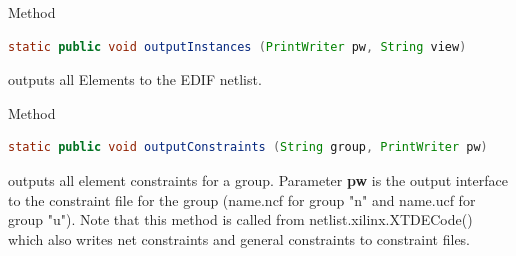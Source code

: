     Method
    \begin{lstlisting}[gobble=4, language=java]
        static public void outputInstances (PrintWriter pw, String view)
    \end{lstlisting}
    outputs all Elements to the EDIF netlist.

    Method
    \begin{lstlisting}[gobble=4, language=java]
        static public void outputConstraints (String group, PrintWriter pw)
    \end{lstlisting}
    outputs all element constraints for a group. Parameter {\bf pw} is
    the output interface to the constraint file for the group (name.ncf
    for group "n" and name.ucf for group "u"). Note that this method is
    called from netlist.xilinx.XTDECode() which also writes net
    constraints and general constraints to constraint files.
